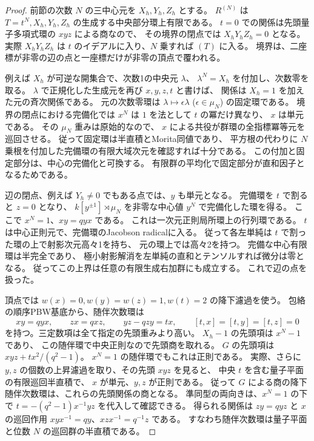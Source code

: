 \begin{proof}
前節の次数 $N$ の三中心元を $X_h,Y_h,Z_h$ とする。
$R^{(N)}$ は $T=t^N,X_h,Y_h,Z_h$ の生成する中央部分環上有限である。
$t=0$ での関係は先頭量子多項式環の $xyz$ による商なので、
その境界の閉点では $X_hY_hZ_h=0$ となる。
実際 $X_hY_hZ_h$ は $t$ のイデアルに入り、$N$ 乗すれば $(T)$ に入る。
境界は、二座標が非零の辺の点と一座標だけが非零の頂点で覆われる。

例えば $X_h$ が可逆な開集合で、次数1の中央元 $\lambda$、
$\lambda^N=X_h$ を付加し、次数零を取る。
$\lambda$ で正規化した生成元を再び $x,y,z,t$ と書けば、
関係は $X_h=1$ を加えた元の斉次関係である。
元の次数零環は $\lambda\mapsto\epsilon\lambda$ ($\epsilon\in\mu_N$) の固定環である。
境界の閉点における完備化では $x^N$ は $1$ を法として $t$ の冪だけ異なり、
$x$ は単元である。
その $\mu_N$ 重みは原始的なので、
$x$ による共役が群環の全指標冪等元を巡回させる。
従って固定環は半直積とMorita同値であり、
平方根の代わりに $N$ 乗根を付加した完備環の有限大域次元を確認すれば十分である。
この付加と固定部分は、中心の完備化と可換する。
有限群の平均化で固定部分が直和因子となるためである。

辺の閉点、例えば $Y_h\ne0$ でもある点では、$y$ も単元となる。
完備環を $t$ で割ると $z=0$ となり、
$k[y^{\pm1}]\rtimes\mu_N$ を非零な中心値 $y^N$ で完備化した環を得る。
ここで $x^N=1$、$xy=qyx$ である。
これは一次元正則局所環上の行列環である。
$t$ は中心正則元で、完備環のJacobson radicalに入る。
従って各左単純は $t$ で割った環の上で射影次元高々1を持ち、
元の環上では高々2を持つ。
完備な中心有限環は半完全であり、
極小射影解消を左単純の直和とテンソルすれば微分は零となる。
従ってこの上界は任意の有限生成右加群にも成立する。
これで辺の点を扱った。

頂点では $w(x)=0,w(y)=w(z)=1,w(t)=2$ の降下濾過を使う。
包絡の順序PBW基底から、随伴次数環は
\[
 xy=qyx,\qquad zx=qxz,\qquad yz-qzy=tx,\qquad
 [t,x]=[t,y]=[t,z]=0
\]
を持つ。三定数項は全て指定の先頭重みより高い。
$X_h-1$ の先頭項は $x^N-1$ であり、
この随伴環で中央正則なので先頭商を取れる。
$G$ の先頭項は $xyz+t x^2/(q^2-1)$。
$x^N=1$ の随伴環でもこれは正則である。
実際、さらに $y,z$ の個数の上昇濾過を取り、その先頭 $xyz$ を見ると、
中央 $t$ を含む量子平面の有限巡回半直積で、
$x$ が単元、$y,z$ が正則である。
従って $G$ による商の降下随伴次数環は、これらの先頭関係の商となる。
準同型の両向きは、$x^N=1$ の下で
$t=-(q^2-1)x^{-1}yz$ を代入して確認できる。
得られる関係は $zy=qyz$ と $x$ の巡回作用
$x y x^{-1}=q y$、$x z x^{-1}=q^{-1}z$ である。
すなわち随伴次数環は量子平面と位数 $N$ の巡回群の半直積である。


\end{proof}
